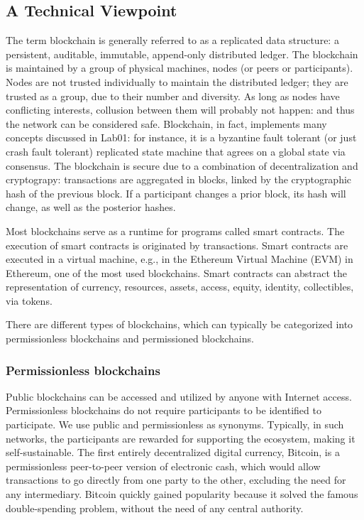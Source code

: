 \documentclass[12pt,a4paper]{article}
\theoremstyle{definition}
\begin{document}
\subsection{A Technical Viewpoint}
The term blockchain is generally referred to as a replicated data structure: a persistent, auditable, immutable, append-only distributed ledger. The blockchain is maintained by a group of physical machines, nodes (or peers or participants). Nodes are not trusted individually to maintain the distributed ledger; they are trusted as a group, due to their number and diversity. As long as nodes have conflicting interests, collusion between them will probably not happen: and thus the network can be considered safe. Blockchain, in fact, implements many concepts discussed in Lab01: for instance, it is a byzantine fault tolerant (or just crash fault tolerant) replicated state machine that agrees on a global state via consensus. The blockchain is secure due to a combination of decentralization and cryptograpy: transactions are aggregated in blocks, linked by the cryptographic hash of the previous block. If a participant changes a prior block, its hash will change, as well as the posterior hashes. 


Most blockchains serve as a runtime for programs called smart contracts. The execution of smart contracts is originated by transactions. Smart contracts are executed in a virtual machine, e.g., in the Ethereum Virtual Machine (EVM) in Ethereum, one of the most used blockchains. Smart contracts can abstract the representation of currency, resources, assets, access, equity, identity, collectibles,  via tokens. 

There are different types of blockchains, which can typically be categorized into permissionless blockchains and permissioned blockchains.

\subsubsection{Permissionless blockchains}
Public blockchains can be accessed and utilized by anyone with Internet access. Permissionless blockchains do not require participants to be identified to participate. We use public and permissionless as synonyms. Typically, in such networks, the participants are rewarded for supporting the ecosystem, making it self-sustainable. The first entirely decentralized digital currency, Bitcoin, is a permissionless peer-to-peer version of electronic cash, which would allow transactions to go directly from one party to the other, excluding the need for any intermediary. Bitcoin quickly gained popularity because it solved the famous double-spending problem, without the need of any central authority. 
\end{document}
